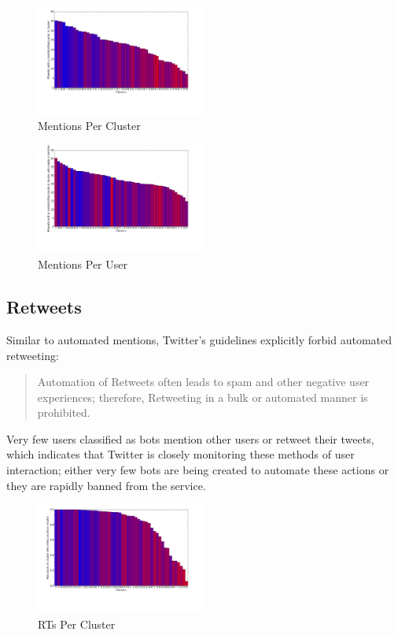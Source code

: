 \documentclass{sig-alternate-05-2015}
\begin{document}
\begin{figure}[h!]
	\caption{Mentions Per Cluster}
	\label{fig:ment1}
	\centering
		\includegraphics[width=0.5\textwidth]{imgs/mentionspercluster}
\end{figure}

\begin{figure}[h!]
	\caption{Mentions Per User}
	\label{fig:ment2}
	\centering
		\includegraphics[width=0.5\textwidth]{imgs/mentionsperuserpercluster}
\end{figure}

\subsection{Retweets}

Similar to automated mentions, Twitter's guidelines explicitly forbid automated retweeting:

\begin{quote}Automation of Retweets often leads to spam and other negative user experiences; therefore, Retweeting in a bulk or automated manner is prohibited.\cite{twitter:automation}\end{quote}

Very few users classified as bots mention other users or retweet their tweets, which indicates that Twitter is closely monitoring these methods of user interaction; either very few bots are being created to automate these actions or they are rapidly banned from the service.

\begin{figure}[h!]
	\caption{RTs Per Cluster}
	\centering
		\includegraphics[width=0.5\textwidth]{imgs/rt3}
\end{figure}
\end{document}
